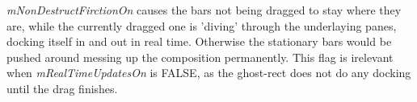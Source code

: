 {\it mNonDestructFirctionOn} causes the bars not being dragged
to stay where they are, while the currently dragged one is 'diving'
through the underlaying panes, docking itself in and out in real time.
Otherwise the stationary bars would be pushed around messing up the composition permanently.
This flag is irelevant when {\it mRealTimeUpdatesOn} is FALSE, as the ghost-rect
does not do any docking until the drag finishes.

